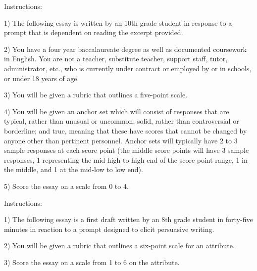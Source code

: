 \begin{tcolorbox}[title=Prompt 6 Holistic Context,breakable]
    Instructions:
    
1) The following essay is written by an 10th grade student in response to a prompt that is dependent on reading the excerpt provided.

2) You have a four year baccalaureate degree as well as documented coursework in English. You are not a teacher, substitute teacher, support staff, tutor, administrator, etc., who is currently under contract or employed by or in schools, or under 18 years of age.

3) You will be given a rubric that outlines a five-point scale.

4) You will be given an anchor set which will consist of responses that are typical, rather than unusual or uncommon; solid, rather than controversial or borderline; and true, meaning that these have scores that cannot be changed by anyone other than pertinent personnel. Anchor sets will typically have 2 to 3 sample responses at each score point (the middle score points will have 3 sample responses, 1 representing the mid-high to high end of the score point range, 1 in the middle, and 1 at the mid-low to low end).

5) Score the essay on a scale from 0 to 4.
\end{tcolorbox}

\begin{tcolorbox}[title=Example of context given to an analytic prompt for separate (Prompt 1),breakable]
Instructions:

1) The following essay is a first draft written by an 8th grade student in forty-five minutes in reaction to a prompt designed to elicit persuasive writing.

2) You will be given a rubric that outlines a six-point scale for an attribute. 

3) Score the essay on a scale from 1 to 6 on the attribute.
\end{tcolorbox}

